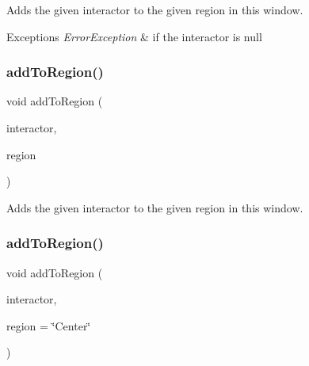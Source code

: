 Adds the given interactor to the given region in this window. 


\begin{DoxyExceptions}{Exceptions}
{\em Error\+Exception} & if the interactor is null \\
\hline
\end{DoxyExceptions}
\mbox{\label{classsgl_1_1GWindow_ad05df0d92ab2fba95d401a5614365558}} 
\subsubsection{\texorpdfstring{add\+To\+Region()}{addToRegion()}\hspace{0.1cm}{\footnotesize\ttfamily [3/4]}}
{\footnotesize\ttfamily void add\+To\+Region (\begin{DoxyParamCaption}\item[{\mbox{\hyperlink{classsgl_1_1GInteractor}{G\+Interactor}} \&}]{interactor,  }\item[{\mbox{\hyperlink{classsgl_1_1GWindow_a81a01a86de31071a92e6cce0bab9bc4b}{Region}}}]{region }\end{DoxyParamCaption})\hspace{0.3cm}{\ttfamily [virtual]}}



Adds the given interactor to the given region in this window. 

\mbox{\label{classsgl_1_1GWindow_a667ed0065e0bbb52a893904e7f2383bb}} 
\subsubsection{\texorpdfstring{add\+To\+Region()}{addToRegion()}\hspace{0.1cm}{\footnotesize\ttfamily [4/4]}}
{\footnotesize\ttfamily void add\+To\+Region (\begin{DoxyParamCaption}\item[{\mbox{\hyperlink{classsgl_1_1GInteractor}{G\+Interactor}} \&}]{interactor,  }\item[{const std\+::string \&}]{region = {\ttfamily \char`\"{}Center\char`\"{}} }\end{DoxyParamCaption})\hspace{0.3cm}{\ttfamily [virtual]}}



